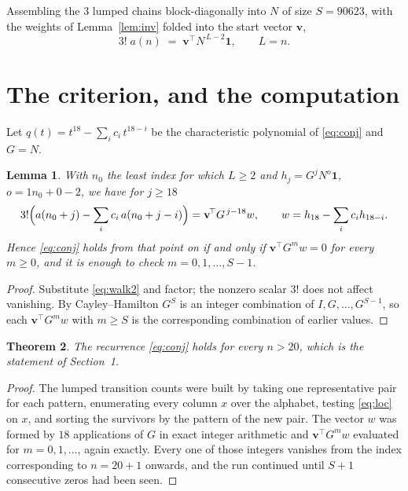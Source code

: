 \documentclass[11pt,a4paper]{article}
\theoremstyle{plain}
\newtheorem{theorem}{Theorem}
\newtheorem{lemma}[theorem]{Lemma}
\theoremstyle{definition}
\begin{document}
Assembling the $3$ lumped chains block-diagonally into $N$ of size $S=90623$, with the
weights of Lemma~\ref{lem:inv} folded into the start vector $\mathbf{v}$,
\begin{equation}\label{eq:walk2}
3!\;a(n)\;=\;\mathbf{v}^{\!\top}N^{\,L-2}\mathbf{1},\qquad L=n .
\end{equation}

\section{The criterion, and the computation}

Let $q(t)=t^{18}-\sum_i c_i\,t^{18-i}$ be the characteristic polynomial of
\eqref{eq:conj} and $G=N$.

\begin{lemma}\label{lem:crit}
With $n_0$ the least index for which $L\ge2$ and $h_j=G^{j}N^{o}\mathbf{1}$,
$o=1n_0+0-2$, we have for $j\ge18$
\[
3!\Bigl(a(n_0+j)-\sum_i c_i\,a(n_0+j-i)\Bigr)
=\mathbf{v}^{\!\top}G^{\,j-18}w,\qquad
w=h_{18}-\sum_i c_i h_{18-i} .
\]
Hence \eqref{eq:conj} holds from that point on if and only if
$\mathbf{v}^{\!\top}G^{m}w=0$ for every $m\ge0$, and it is enough to check
$m=0,1,\dots,S-1$.
\end{lemma}

\begin{proof}
Substitute \eqref{eq:walk2} and factor; the nonzero scalar $3!$ does not affect
vanishing. By Cayley--Hamilton $G^{S}$ is an integer combination of $I,G,\dots,G^{S-1}$,
so each $\mathbf{v}^{\!\top}G^{m}w$ with $m\ge S$ is the corresponding combination of
earlier values.
\end{proof}

\begin{theorem}
The recurrence \eqref{eq:conj} holds for every $n>20$, which is the statement of
Section~1.
\end{theorem}

\begin{proof}
The lumped transition counts were built by taking one representative pair for each pattern,
enumerating every column $x$ over the alphabet, testing \eqref{eq:loc} on $x$, and sorting
the survivors by the pattern of the new pair. The vector $w$ was formed by $18$
applications of $G$ in exact integer arithmetic and $\mathbf{v}^{\!\top}G^{m}w$
evaluated for $m=0,1,\dots$, again exactly. Every one of those integers vanishes from the
index corresponding to $n=20+1$ onwards, and the run continued until $S+1$ consecutive
zeros had been seen.
\end{proof}
\end{document}
